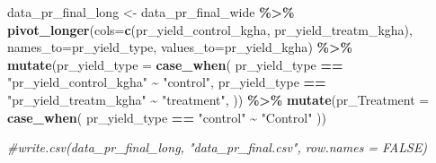 \documentclass[
]{article}
\newenvironment{Shaded}{\begin{snugshade}}{\end{snugshade}}
\newcommand{\AttributeTok}[1]{\textcolor[rgb]{0.13,0.29,0.53}{#1}}
\newcommand{\CommentTok}[1]{\textcolor[rgb]{0.56,0.35,0.01}{\textit{#1}}}
\newcommand{\FunctionTok}[1]{\textcolor[rgb]{0.13,0.29,0.53}{\textbf{#1}}}
\newcommand{\NormalTok}[1]{#1}
\newcommand{\OtherTok}[1]{\textcolor[rgb]{0.56,0.35,0.01}{#1}}
\newcommand{\SpecialCharTok}[1]{\textcolor[rgb]{0.81,0.36,0.00}{\textbf{#1}}}
\newcommand{\StringTok}[1]{\textcolor[rgb]{0.31,0.60,0.02}{#1}}
\begin{document}
\begin{Shaded}
\begin{Highlighting}[]
\NormalTok{data\_pr\_final\_long }\OtherTok{\textless{}{-}} 
\NormalTok{data\_pr\_final\_wide }\SpecialCharTok{\%\textgreater{}\%} 
  \FunctionTok{pivot\_longer}\NormalTok{(}\AttributeTok{cols=}\FunctionTok{c}\NormalTok{(}\StringTok{\textquotesingle{}pr\_yield\_control\_kgha\textquotesingle{}}\NormalTok{, }\StringTok{\textquotesingle{}pr\_yield\_treatm\_kgha\textquotesingle{}}\NormalTok{),}
                    \AttributeTok{names\_to=}\StringTok{\textquotesingle{}pr\_yield\_type\textquotesingle{}}\NormalTok{,}
                    \AttributeTok{values\_to=}\StringTok{\textquotesingle{}pr\_yield\_kgha\textquotesingle{}}\NormalTok{) }\SpecialCharTok{\%\textgreater{}\%} 
  \FunctionTok{mutate}\NormalTok{(}\AttributeTok{pr\_yield\_type =} \FunctionTok{case\_when}\NormalTok{(}
\NormalTok{    pr\_yield\_type }\SpecialCharTok{==} \StringTok{"pr\_yield\_control\_kgha"} \SpecialCharTok{\textasciitilde{}} \StringTok{"control"}\NormalTok{,}
\NormalTok{    pr\_yield\_type }\SpecialCharTok{==} \StringTok{"pr\_yield\_treatm\_kgha"} \SpecialCharTok{\textasciitilde{}} \StringTok{"treatment"}\NormalTok{,}
\NormalTok{  )) }\SpecialCharTok{\%\textgreater{}\%} 
  \FunctionTok{mutate}\NormalTok{(}\AttributeTok{pr\_Treatment =} \FunctionTok{case\_when}\NormalTok{(}
\NormalTok{    pr\_yield\_type }\SpecialCharTok{==} \StringTok{"control"} \SpecialCharTok{\textasciitilde{}} \StringTok{"Control"}
\NormalTok{  ))}

\CommentTok{\#write.csv(data\_pr\_final\_long, "data\_pr\_final.csv", row.names = FALSE)}
\end{Highlighting}
\end{Shaded}
\end{document}
